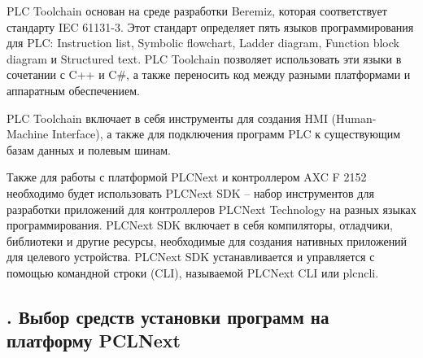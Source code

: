 {	\par \redline PLC Toolchain основан на среде разработки Beremiz, которая соответствует стандарту IEC 61131-3. Этот стандарт определяет пять языков программирования для PLC: Instruction list, Symbolic flowchart, Ladder diagram, Function block diagram и Structured text. PLC Toolchain позволяет использовать эти языки в сочетании с C++ и C\#, а также переносить код между разными платформами и аппаратным обеспечением.

	\par \redline PLC Toolchain включает в себя инструменты для создания HMI (Human-Machine Interface), а также для подключения программ PLC к существующим базам данных и полевым шинам. 

	\par \redline Также для работы с платформой PLCNext и контроллером AXC F 2152 необходимо будет использовать PLCNext SDK – набор инструментов для разработки приложений для контроллеров PLCNext Technology на разных языках программирования. PLCNext SDK включает в себя компиляторы, отладчики, библиотеки и другие ресурсы, необходимые для создания нативных приложений для целевого устройства. PLCNext SDK устанавливается и управляется с помощью командной строки (CLI), называемой PLCNext CLI или plcncli.

	\par
}

\subtitlespace

\subsection*{ 
	\gostTitleFont
	\redline
	\thechaptercntr .\thesubchaptercntr \spc
	Выбор средств установки программ на платформу PCLNext
} \addtocounter{subchaptercntr}{1}

\subtitlespace

